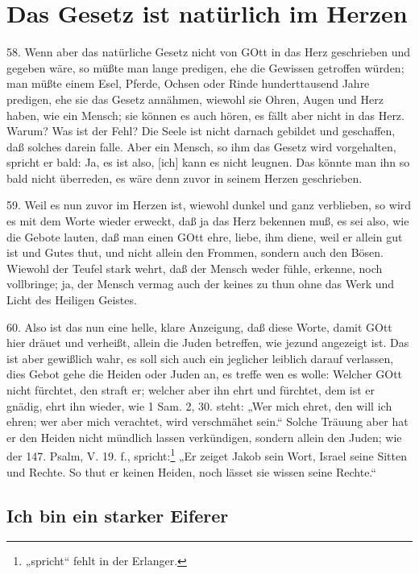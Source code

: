 \section{Das Gesetz ist natürlich im Herzen}

58. Wenn aber das natürliche Gesetz nicht von GOtt in das Herz geschrieben und gegeben wäre, so müßte man lange predigen, ehe die Gewissen getroffen würden; man müßte einem Esel, Pferde, Ochsen oder Rinde hunderttausend Jahre predigen, ehe sie das Gesetz annähmen, wiewohl sie Ohren, Augen und Herz haben, wie ein Mensch; sie können es auch hören, es fällt aber nicht in das Herz. Warum? Was ist der Fehl? Die Seele ist nicht darnach gebildet und geschaffen, daß solches darein falle. Aber ein Mensch, so ihm das Gesetz wird vorgehalten, spricht er bald: Ja, es ist also, [ich] kann es nicht leugnen. Das könnte man ihn so bald nicht überreden, es wäre denn zuvor in seinem Herzen geschrieben.

59. Weil es nun zuvor im Herzen ist, wiewohl dunkel und ganz verblieben, so wird es mit dem Worte wieder erweckt, daß ja das Herz bekennen muß, es sei also, wie die Gebote lauten, daß man einen GOtt ehre, liebe, ihm diene, weil er allein gut ist und Gutes thut, und nicht allein den Frommen, sondern auch den Bösen. Wiewohl der Teufel stark wehrt, daß der Mensch weder fühle, erkenne, noch vollbringe; ja, der Mensch vermag auch der keines zu thun ohne das Werk und Licht des Heiligen Geistes.

60. Also ist das nun eine helle, klare Anzeigung, daß diese Worte, damit GOtt hier dräuet und verheißt, allein die Juden betreffen, wie jezund angezeigt ist. Das ist aber gewißlich wahr, es soll sich auch ein jeglicher leiblich darauf verlassen, dies Gebot gehe die Heiden oder Juden an, es treffe wen es wolle: Welcher GOtt nicht fürchtet, den straft er; welcher aber ihn ehrt und fürchtet, dem ist er gnädig, ehrt ihn wieder, wie 1 Sam. 2, 30. steht: „Wer mich ehret, den will ich ehren; wer aber mich verachtet, wird verschmähet sein.“ Solche Träuung aber hat er den Heiden nicht mündlich lassen verkündigen,
sondern allein den Juden; wie der 147. Psalm, V. 19. f., spricht:\footnote{„spricht“ fehlt in der Erlanger.} „Er zeiget Jakob sein Wort, Israel seine Sitten und Rechte. So thut er keinen Heiden, noch lässet sie wissen seine Rechte.“

\subsection{Ich bin ein starker Eiferer}

